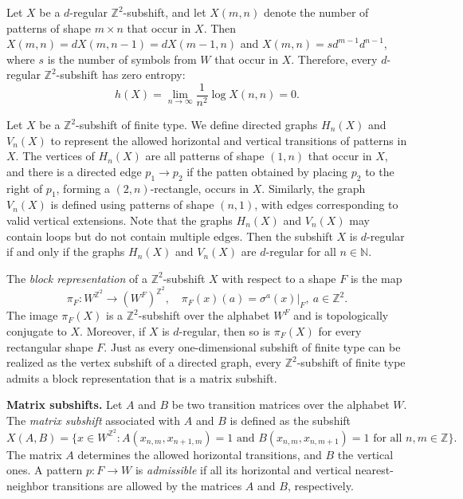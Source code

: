 \documentclass[12pt]{article}
\theoremstyle{definition}
\begin{document}
Let $X$ be a $d$-regular $\mathbb{Z}^2$-subshift, and let $X(m,n)$ denote the number of patterns of shape $m\times n$ that occur in $X$. Then $X(m,n)=dX(m,n-1)=dX(m-1,n)$ and $X(m,n)=sd^{m-1}d^{n-1}$, where $s$ is the number of symbols from $W$ that occur in $X$. Therefore, every $d$-regular $\mathbb{Z}^2$-subshift has zero entropy:
\[
h(X)=\lim_{n\rightarrow\infty} \frac{1}{n^2} \log X(n,n)=0.
\]

Let $X$ be a $\mathbb{Z}^2$-subshift of finite type. We define directed graphs $H_n(X)$ and $V_n(X)$ to represent the allowed horizontal and vertical transitions of patterns in $X$. The vertices of $H_n(X)$ are all patterns of shape $(1,n)$ that occur in $X$, and there is a directed edge $p_1\rightarrow p_2$ if the patten obtained by placing $p_2$ to the right of $p_1$, forming a $(2,n)$-rectangle, occurs in $X$. Similarly, the graph
$V_n(X)$ is defined using patterns of shape $(n,1)$, with edges corresponding to valid vertical extensions. Note that the graphs $H_n(X)$ and $V_n(X)$ may contain loops but do not contain multiple edges.
Then the subshift $X$ is $d$-regular if and only if the graphs $H_n(X)$ and $V_n(X)$ are $d$-regular for all $n\in\mathbb{N}$.

The \textit{block representation} of a $\mathbb{Z}^2$-subshift $X$ with respect to a shape $F$ is the map
\[
\pi_F: W^{\mathbb{Z}^2}\rightarrow (W^F)^{\mathbb{Z}^2}, \quad \pi_F(x)(a)= \sigma^a(x)|_F, \ a\in\mathbb{Z}^2.
\]
The image $\pi_F(X)$ is a $\mathbb{Z}^2$-subshift over the alphabet $W^{F}$ and is topologically conjugate to $X$. Moreover, if $X$ is $d$-regular, then so is $\pi_F(X)$ for every rectangular shape $F$. Just as every one-dimensional subshift of finite type can be realized as the vertex subshift of a directed graph, every $\mathbb{Z}^2$-subshift of finite type admits a block representation that is a matrix subshift.

\vspace{0.2cm}
\textbf{Matrix subshifts.}
Let $A$ and $B$ be two transition matrices over the alphabet $W$. The \textit{matrix subshift} associated with $A$ and $B$ is defined as the subshift
\[
X(A,B)=\{ x\in W^{\mathbb{Z}^2} :  A(x_{n,m},x_{n+1,m})=1 \mbox{ and } B(x_{n,m},x_{n,m+1})=1  \mbox{ for all $n,m\in\mathbb{Z}$} \}.
\]
The matrix $A$ determines the allowed horizontal transitions, and $B$ the vertical ones. A pattern $p:F\rightarrow W$ is \textit{admissible} if all its horizontal and vertical nearest-neighbor transitions are allowed by the matrices $A$ and $B$, respectively.
\end{document}
